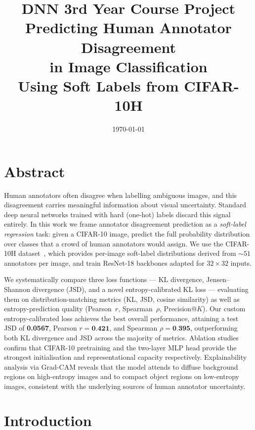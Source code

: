 \documentclass[11pt,a4paper]{article}
\title{%
  \vspace{-1cm}
  {\large DNN 3rd Year Course Project}\\[0.4em]
  {\LARGE\bfseries Predicting Human Annotator Disagreement\\
  in Image Classification}\\[0.4em]
  {\normalsize Using Soft Labels from CIFAR-10H}
}
\author{%
}
\date{\today}
\begin{document}
\maketitle
\tableofcontents
\newpage

\section*{Abstract}

Human annotators often disagree when labelling ambiguous images, and this
disagreement carries meaningful information about visual uncertainty.
Standard deep neural networks trained with hard (one-hot) labels discard
this signal entirely.
In this work we frame annotator disagreement prediction as a
\emph{soft-label regression} task: given a CIFAR-10 image, predict the full
probability distribution over classes that a crowd of human annotators would
assign.
We use the CIFAR-10H dataset~\cite{peterson2019human}, which provides
per-image soft-label distributions derived from ${\sim}51$ annotators per
image, and train ResNet-18 backbones adapted for $32{\times}32$ inputs.

We systematically compare three loss functions — KL divergence,
Jensen--Shannon divergence (JSD), and a novel entropy-calibrated KL loss —
evaluating them on distribution-matching metrics (KL, JSD, cosine similarity)
as well as entropy-prediction quality (Pearson~$r$, Spearman~$\rho$,
Precision@$K$).
Our custom entropy-calibrated loss achieves the best overall performance,
attaining a test JSD of \textbf{0.0567}, Pearson $r = \textbf{0.421}$, and
Spearman $\rho = \textbf{0.395}$, outperforming both KL divergence and JSD
across the majority of metrics.
Ablation studies confirm that CIFAR-10 pretraining and the two-layer MLP head
provide the strongest initialisation and representational capacity
respectively.
Explainability analysis via Grad-CAM reveals that the model attends to
diffuse background regions on high-entropy images and to compact object
regions on low-entropy images, consistent with the underlying sources of
human annotator uncertainty.

\newpage

\section{Introduction}
\end{document}
